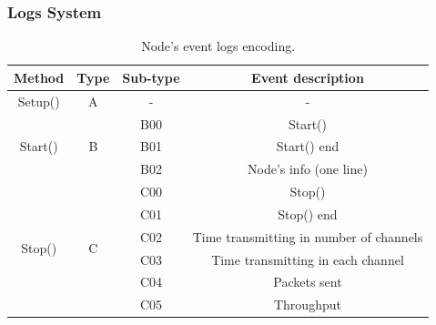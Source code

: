 \documentclass[a4paper]{article}
\begin{document}
		\subsubsection{Logs System}
		\label{section:logs_system}	
		\begin{table}[]
		\centering
		\scriptsize
		\caption{Node's event logs encoding.}
		\label{table:event_coding}
		\begin{tabular}{|c|c|c|c|}
		\hline
		\textbf{Method}                            & \textbf{Type}       & \textbf{Sub-type} & \textbf{Event description}                              \\ \hline
		Setup()                                    & A                   & -                 & -                                                       \\ \hline
		\multirow{3}{*}{Start()}                   & \multirow{3}{*}{B}  & B00               & Start()                                                 \\ \cline{3-4} 
		                                           &                     & B01               & Start() end                                             \\ \cline{3-4} 
		                                           &                     & B02               & Node's info (one line)                                  \\ \hline
		\multirow{6}{*}{Stop()}                    & \multirow{6}{*}{C}  & C00               & Stop()                                                  \\ \cline{3-4} 
		                                           &                     & C01               & Stop() end                                              \\ \cline{3-4} 
		                                           &                     & C02               & Time transmitting in number of channels                 \\ \cline{3-4} 
		                                           &                     & C03               & Time transmitting in each channel                       \\ \cline{3-4} 
		                                           &                     & C04               & Packets sent                                            \\ \cline{3-4} 
		                                           &                     & C05               & Throughput                                              \\ \hline

\end{tabular}
\end{table}
\end{document}
